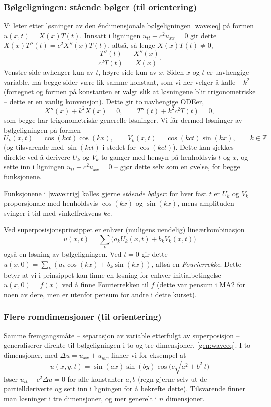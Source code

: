 \subsubsection*{Bølgeligningen: stående bølger (til orientering)}
Vi leter etter løsninger av den éndimensjonale bølgeligningen \eqref{wave:eq} på formen $u(x,t)=X(x)T(t)$. Innsatt i ligningen $u_{tt}-c^2u_{xx}=0$ gir dette $X(x)T''(t) = c^2X''(x)T(t)$, altså, så lenge $X(x)T(t)\neq 0$,
\[
\frac{T''(t)}{c^2T(t)} = \frac{X''(x)}{X(x)}.
\]
Venstre side avhenger kun av $t$, høyre side kun av $x$. Siden $x$ og $t$ er uavhengige variable, må begge sider være lik samme konstant, som vi her velger å kalle $-k^2$ (fortegnet og formen på konstanten er valgt slik at løsningene blir trigonometriske -- dette er en vanlig konvensjon). Dette gir to uavhengige ODEer,
\[
X''(x) + k^2 X(x) = 0, \qquad T''(t) + k^2c^2 T(t) = 0,
\]
som begge har trigonometriske generelle løsninger. Vi får dermed løsninger av bølgeligningen på formen
\begin{equation}\label{wave:trig}
U_k(x,t) = \cos(kct)\cos(kx), \qquad V_k(x,t) = \cos(kct)\sin(kx), \qquad k\in\mathbb{Z}
\end{equation}
(og tilsvarende med $\sin(kct)$ i stedet for $\cos(kct)$). Dette kan sjekkes direkte ved å derivere $U_k$ og $V_k$ to ganger med hensyn på henholdsvis $t$ og $x$, og sette inn i ligningen $u_{tt}-c^2u_{xx}=0$ -- gjør dette selv som en øvelse, for begge funksjonene.

Funksjonene i \eqref{wave:trig} kalles gjerne \emph{stående bølger}: for hver fast $t$ er $U_k$ og $V_k$ proporsjonale med henholdsvis $\cos(kx)$ og $\sin(kx)$, mens amplituden svinger i tid med vinkelfrekvens $kc$.

Ved superposisjonsprinsippet er enhver (muligens uendelig) lineærkombinasjon
\[
u(x,t) = \sum_k \big(a_k U_k(x,t) + b_k V_k(x,t)\big)
\]
også en løsning av bølgeligningen. Ved $t=0$ gir dette $u(x,0)=\sum_k(a_k\cos(kx)+b_k\sin(kx))$, altså en \emph{Fourierrekke}. Dette betyr at vi i prinsippet kan finne en løsning for enhver initialbetingelse $u(x,0)=f(x)$ ved å finne Fourierrekken til $f$ (dette var pensum i MA2 for noen av dere, men er utenfor pensum for andre i dette kurset).

\subsubsection*{Flere romdimensjoner (til orientering)}
Samme fremgangsmåte -- separasjon av variable etterfulgt av superposisjon -- generaliserer direkte til bølgeligningen i to og tre dimensjoner, \eqref{gen:waveeq}. I to dimensjoner, med $\Delta u = u_{xx}+u_{yy}$, finner vi for eksempel at
\[
u(x,y,t) = \sin(ax)\sin(by)\cos\!\big(c\sqrt{a^2+b^2}\,t\big)
\]
løser $u_{tt}-c^2\Delta u=0$ for alle konstanter $a,b$ (regn gjerne selv ut de partiellderiverte og sett inn i ligningen for å bekrefte dette). Tilsvarende finner man løsninger i tre dimensjoner, og mer generelt i $n$ dimensjoner.

